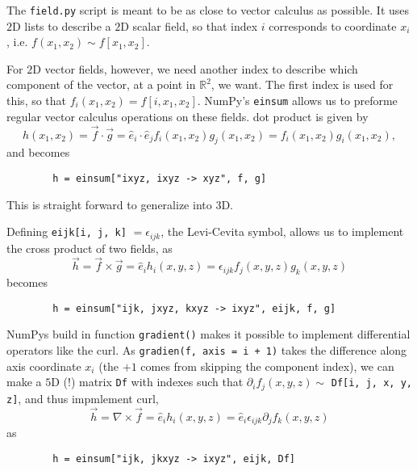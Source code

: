 \documentclass{article}
\begin{document}
    The \verb|field.py| script is meant to be as close to vector calculus as possible. It uses $2\textrm{D}$ lists to describe a $2\textrm{D}$ scalar field, so that index $i$ corresponds to coordinate $x_i$, i.e. $f(x_1, x_2) \sim f[x_1, x_2]$.
    
    For $2\textrm{D}$ vector fields, however, we need another index to describe which component of the vector, at a point in $\mathbb{R} ^2$, we want. The first index is used for this, so that $f_i(x_1, x_2) = f[i, x_1, x_2]$. NumPy's \verb|einsum| allows us to preforme regular vector calculus operations on these fields. dot product is given by
    $$
    h(x_1, x_2) = \vec f\cdot \vec g = \hat e_i \cdot \hat e_j f_i(x_1, x_2)  g_j(x_1, x_2) = f_i(x_1, x_2)g_i(x_1, x_2),
    $$
    and becomes
    \begin{verbatim}
        h = einsum["ixyz, ixyz -> xyz", f, g]
    \end{verbatim}
    This is straight forward to generalize into 3D. 

    Defining \verb|eijk[i, j, k]| $ = \epsilon_{ijk}$, the Levi-Cevita symbol, allows us to implement the cross product of two fields, as
    $$
        \vec h = \vec f \times \vec g = \hat e_i h_i(x, y, z) =  \epsilon_{ijk} f_j(x, y, z) g_k(x, y, z)
    $$
    becomes
    \begin{verbatim}
        h = einsum["ijk, jxyz, kxyz -> ixyz", eijk, f, g]
    \end{verbatim}
    NumPys build in function \verb|gradient()| makes it possible to implement differential operators like the curl. As \verb|gradien(f, axis = i + 1)| takes the difference along axis coordinate $x_i$ (the $+1$ comes from skipping the component index), we can make a $5 \textrm{D}$ (!) matrix \verb|Df| with indexes such that $\partial_i f_j(x, y, z)\sim$ \verb|Df[i, j, x, y, z]|, and thus impmlement curl,
    $$
        \vec h = \nabla \times \vec f = \hat e_i h_i(x, y, z) =  \hat e_i \epsilon_{ijk} \partial_j f_k(x, y, z)
    $$
    as
    \begin{verbatim}
        h = einsum["ijk, jkxyz -> ixyz", eijk, Df]
    \end{verbatim}
\end{document}
